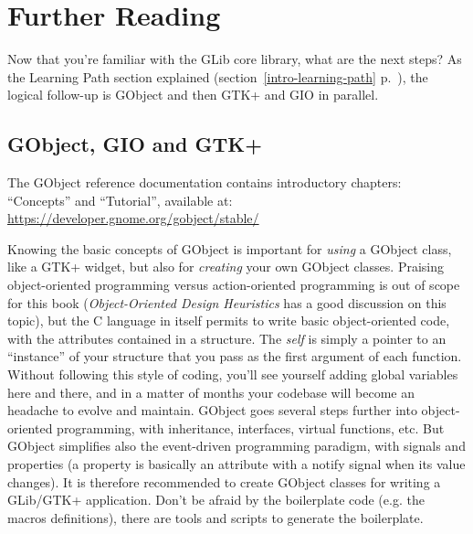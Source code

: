 \chapter{Further Reading}
\label{further-reading}

Now that you're familiar with the GLib core library, what are the next steps? As the Learning Path section explained (section~\ref{intro-learning-path} p.~\pageref{intro-learning-path}), the logical follow-up is GObject and then GTK+ and GIO in parallel.

\section{GObject, GIO and GTK+}

The GObject reference documentation contains introductory chapters: ``Concepts'' and ``Tutorial'', available at:\\
\url{https://developer.gnome.org/gobject/stable/}

Knowing the basic concepts of GObject is important for \emph{using} a GObject class, like a GTK+ widget, but also for \emph{creating} your own GObject classes. Praising object-oriented programming versus action-oriented programming is out of scope for this book (\emph{Object-Oriented Design Heuristics} \cite{oop-book} has a good discussion on this topic), but the C language in itself permits to write basic object-oriented code, with the attributes contained in a structure. The \emph{self} is simply a pointer to an ``instance'' of your structure that you pass as the first argument of each function. Without following this style of coding, you'll see yourself adding global variables here and there, and in a matter of months your codebase will become an headache to evolve and maintain. GObject goes several steps further into object-oriented programming, with inheritance, interfaces, virtual functions, etc. But GObject simplifies also the event-driven programming paradigm, with signals and properties (a property is basically an attribute with a notify signal when its value changes). It is therefore recommended to create GObject classes for writing a GLib/GTK+ application. Don't be afraid by the boilerplate code (e.g. the macros definitions), there are tools and scripts to generate the boilerplate.

